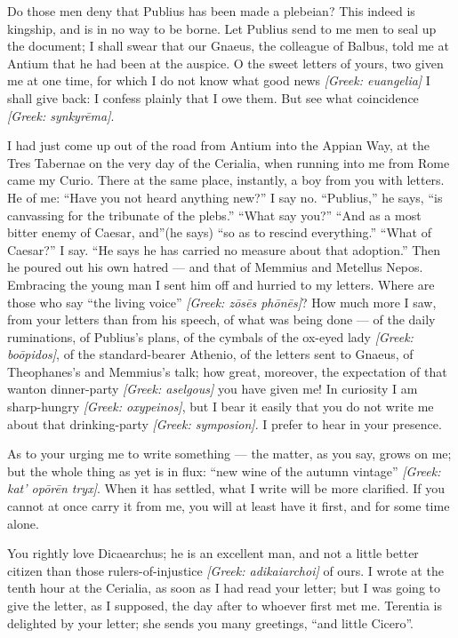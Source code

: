 

 Do those men deny that Publius has been made a plebeian? This indeed is kingship, and is in no way to be borne. Let Publius send to me men to seal up the document; I shall swear that our Gnaeus, the colleague of Balbus, told me at Antium that he had been at the auspice. O the sweet letters of yours, two given me at one time, for which I do not know what good news \textit{[Greek: euangelia]} I shall give back: I confess plainly that I owe them. But see what coincidence \textit{[Greek: synkyr\=ema]}.

 I had just come up out of the road from Antium into the Appian Way, at the Tres Tabernae on the very day of the Cerialia, when running into me from Rome came my Curio. There at the same place, instantly, a boy from you with letters. He of me: ``Have you not heard anything new?'' I say no. ``Publius,'' he says, ``is canvassing for the tribunate of the plebs.'' ``What say you?'' ``And as a most bitter enemy of Caesar, and''(he says) ``so as to rescind everything.'' ``What of Caesar?'' I say. ``He says he has carried no measure about that adoption.'' Then he poured out his own hatred --- and that of Memmius and Metellus Nepos. Embracing the young man I sent him off and hurried to my letters. Where are those who say ``the living voice'' \textit{[Greek: z\=os\=es ph\=on\=es]}? How much more I saw, from your letters than from his speech, of what was being done --- of the daily ruminations, of Publius's plans, of the cymbals of the ox-eyed lady \textit{[Greek: bo\=opidos]}, of the standard-bearer Athenio, of the letters sent to Gnaeus, of Theophanes's and Memmius's talk; how great, moreover, the expectation of that wanton dinner-party \textit{[Greek: aselgous]} you have given me! In curiosity I am sharp-hungry \textit{[Greek: oxypeinos]}, but I bear it easily that you do not write me about that drinking-party \textit{[Greek: symposion]}. I prefer to hear in your presence.

 As to your urging me to write something --- the matter, as you say, grows on me; but the whole thing as yet is in flux: ``new wine of the autumn vintage'' \textit{[Greek: kat' op\=or\=en tryx]}. When it has settled, what I write will be more clarified. If you cannot at once carry it from me, you will at least have it first, and for some time alone.

 You rightly love Dicaearchus; he is an excellent man, and not a little better citizen than those rulers-of-injustice \textit{[Greek: adikaiarchoi]} of ours. I wrote at the tenth hour at the Cerialia, as soon as I had read your letter; but I was going to give the letter, as I supposed, the day after to whoever first met me. Terentia is delighted by your letter; she sends you many greetings, ``and little Cicero''.
